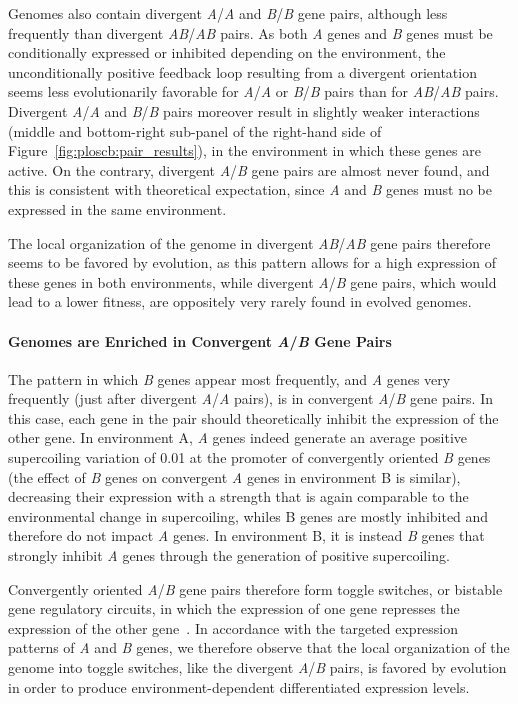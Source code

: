 Genomes also contain divergent \emph{A}/\emph{A} and \emph{B}/\emph{B} gene pairs, although less frequently than divergent \emph{AB}/\emph{AB} pairs.
As both \emph{A} genes and \emph{B} genes must be conditionally expressed or inhibited depending on the environment, the unconditionally positive feedback loop resulting from a divergent orientation seems less evolutionarily favorable for \emph{A}/\emph{A} or \emph{B}/\emph{B} pairs than for \emph{AB}/\emph{AB} pairs.
Divergent \emph{A}/\emph{A} and \emph{B}/\emph{B} pairs moreover result in slightly weaker interactions (middle and bottom-right sub-panel of the right-hand side of Figure~\ref{fig:ploscb:pair_results}), in the environment in which these genes are active.
On the contrary, divergent \emph{A}/\emph{B} gene pairs are almost never found, and this is consistent with theoretical expectation, since \emph{A} and \emph{B} genes must no be expressed in the same environment.

The local organization of the genome in divergent \emph{AB}/\emph{AB} gene pairs therefore seems to be favored by evolution, as this pattern allows for a high expression of these genes in both environments, while divergent \emph{A}/\emph{B} gene pairs, which would lead to a lower fitness, are oppositely very rarely found in evolved genomes.

\paragraph{Genomes are Enriched in Convergent \emph{A}/\emph{B} Gene Pairs}
The pattern in which \emph{B} genes appear most frequently, and \emph{A} genes very frequently (just after divergent \emph{A}/\emph{A} pairs), is in convergent \emph{A}/\emph{B} gene pairs.
In this case, each gene in the pair should theoretically inhibit the expression of the other gene.
In environment A, \emph{A} genes indeed generate an average positive supercoiling variation of 0.01 at the promoter of convergently oriented \emph{B} genes (the effect of \emph{B} genes on convergent \emph{A} genes in environment B is similar), decreasing their expression with a strength that is again comparable to the environmental change in supercoiling, whiles B genes are mostly inhibited and therefore do not impact \emph{A} genes.
In environment B, it is instead \emph{B} genes that strongly inhibit \emph{A} genes through the generation of positive supercoiling.

Convergently oriented \emph{A}/\emph{B} gene pairs therefore form toggle switches, or bistable gene regulatory circuits, in which the expression of one gene represses the expression of the other gene~\citep{gardner2000}.
In accordance with the targeted expression patterns of \emph{A} and \emph{B} genes, we therefore observe that the local organization of the genome into toggle switches, like the divergent \emph{A}/\emph{B} pairs, is favored by evolution in order to produce environment-dependent differentiated expression levels.


